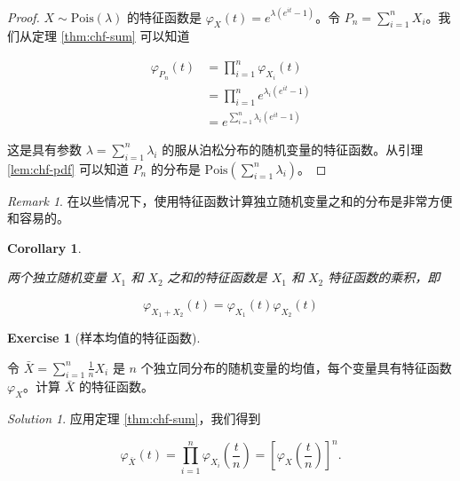 \documentclass[
  12pt,
]{krantz}
\newtheorem{corollary}{Corollary}[chapter]
\theoremstyle{definition}
\theoremstyle{definition}
\theoremstyle{definition}
\newtheorem{exercise}{Exercise}[chapter]
\theoremstyle{definition}
\theoremstyle{remark}
\newtheorem*{remark}{Remark}
\newtheorem*{solution}{Solution}
\begin{document}
\begin{proof}

\(X\sim\mathrm{Pois}(\lambda)\) 的特征函数是 \(\varphi _{X}(t)=e^{\lambda (e^{it}-1)}\)。令 \(P_n=\sum_{i=1}^nX_i\)。我们从定理 \ref{thm:chf-sum} 可以知道

\begin{equation*}
\begin{split}
\varphi _{P_{n}}(t) & =\prod_{i=1}^n\varphi _{X_i}(t) \\
& =\prod_{i=1}^n e^{\lambda_i (e^{it}-1)} \\
& = e^{\sum_{i=1}^n \lambda_i (e^{it}-1)}
\end{split}
\end{equation*}

这是具有参数 \(\lambda=\sum_{i=1}^n \lambda_i\) 的服从泊松分布的随机变量的特征函数。从引理 \ref{lem:chf-pdf} 可以知道 \(P_n\) 的分布是 \(\mathrm{Pois}(\sum_{i=1}^n\lambda_i)\)。

\end{proof}

\begin{remark}

在以些情况下，使用特征函数计算独立随机变量之和的分布是非常方便和容易的。

\end{remark}

\begin{corollary}
\protect\hypertarget{cor:unlabeled-div-6}{}\label{cor:unlabeled-div-6}

两个独立随机变量 \(X_1\) 和 \(X_2\) 之和的特征函数是 \(X_1\) 和 \(X_2\) 特征函数的乘积，即

\[\varphi _{X_1+X_2}(t)=\varphi _{X_1}(t) \varphi _{X_2}(t)\]

\end{corollary}

\begin{exercise}[样本均值的特征函数]
\protect\hypertarget{exr:unlabeled-div-7}{}\label{exr:unlabeled-div-7}

令 \(\bar{X}=\sum_{i=1}^n \frac{1}{n} X_i\) 是 \(n\) 个独立同分布的随机变量的均值，每个变量具有特征函数 \(\varphi _{X}\)。计算 \(\bar{X}\) 的特征函数。

\end{exercise}

\begin{solution}

应用定理 \ref{thm:chf-sum}，我们得到

\[\varphi _{\bar{X}}(t)=\prod_{i=1}^n \varphi _{X_i}\left(\frac{t}{n}\right)=\left[\varphi _{X}\left(\frac{t}{n}\right)\right]^n.\]

\end{solution}
\end{document}
